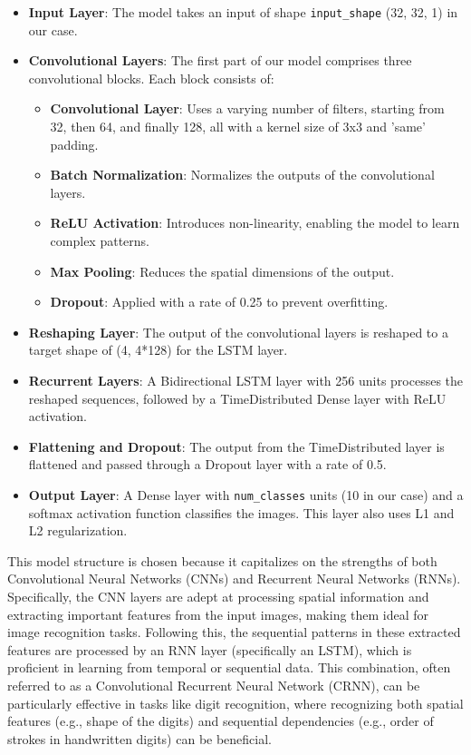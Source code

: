 \begin{itemize}
    \item \textbf{Input Layer}: The model takes an input of shape \texttt{input\_shape} (32, 32, 1) in our case.
    \item \textbf{Convolutional Layers}: The first part of our model comprises three convolutional blocks. Each block consists of:
          \begin{itemize}
              \item \textbf{Convolutional Layer}: Uses a varying number of filters, starting from 32, then 64, and finally 128, all with a kernel size of 3x3 and 'same' padding.
              \item \textbf{Batch Normalization}: Normalizes the outputs of the convolutional layers.
              \item \textbf{ReLU Activation}: Introduces non-linearity, enabling the model to learn complex patterns.
              \item \textbf{Max Pooling}: Reduces the spatial dimensions of the output.
              \item \textbf{Dropout}: Applied with a rate of 0.25 to prevent overfitting.
          \end{itemize}
    \item \textbf{Reshaping Layer}: The output of the convolutional layers is reshaped to a target shape of (4, 4*128) for the LSTM layer.
    \item \textbf{Recurrent Layers}: A Bidirectional LSTM layer with 256 units processes the reshaped sequences, followed by a TimeDistributed Dense layer with ReLU activation.
    \item \textbf{Flattening and Dropout}: The output from the TimeDistributed layer is flattened and passed through a Dropout layer with a rate of 0.5.
    \item \textbf{Output Layer}: A Dense layer with \texttt{num\_classes} units (10 in our case) and a softmax activation function classifies the images. This layer also uses L1 and L2 regularization.
\end{itemize}

This model structure is chosen because it capitalizes on the strengths of both Convolutional Neural Networks (CNNs) and Recurrent Neural Networks (RNNs). Specifically, the CNN layers are adept at processing spatial information and extracting important features from the input images, making them ideal for image recognition tasks. Following this, the sequential patterns in these extracted features are processed by an RNN layer (specifically an LSTM), which is proficient in learning from temporal or sequential data. This combination, often referred to as a Convolutional Recurrent Neural Network (CRNN), can be particularly effective in tasks like digit recognition, where recognizing both spatial features (e.g., shape of the digits) and sequential dependencies (e.g., order of strokes in handwritten digits) can be beneficial.

